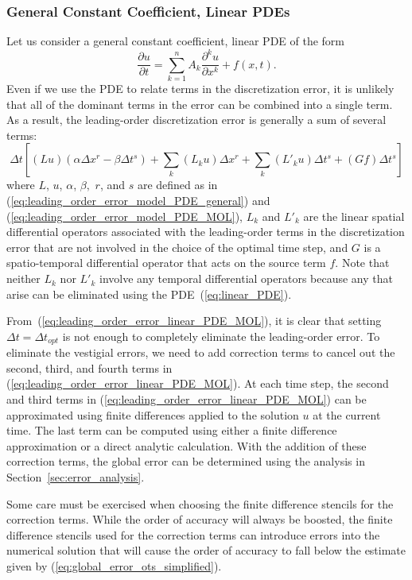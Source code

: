 \documentclass[fleqn,12pt,twoside]{article}
\newcommand{\beq}{\begin{equation}}
\newcommand{\eeq}{\end{equation}}
\def\dt{\Delta t}
\def\dx{\Delta x}
\def\dto{\dt_{opt}}
\begin{document}
\subsubsection*{\label{sec:ots_linear_pde} 
            General Constant Coefficient, Linear PDEs} 
Let us consider a general constant coefficient, linear PDE of the form
\beq
  \frac{\partial u}{\partial t} = 
  \sum_{k=1}^n A_k \frac{\partial^k u}{\partial x^k} + f(x,t)
  \label{eq:linear_PDE}.
\eeq
Even if we use the PDE to relate terms in the discretization error, it is
unlikely that all of the dominant terms in the error can be combined into 
a single term.   As a result, the leading-order discretization error is
generally a sum of several terms:
\beq
  \dt\left[ (L u) (\alpha \dx^r - \beta \dt^s) 
  + \sum_k (L_k u) \dx^r 
  + \sum_k (L'_k u) \dt^s 
  + (G f) \dt^s \right]
  \label{eq:leading_order_error_linear_PDE_MOL}
\eeq
where $L$, $u$, $\alpha$, $\beta,$ $r$, and $s$ are defined as in
(\ref{eq:leading_order_error_model_PDE_general}) and
(\ref{eq:leading_order_error_model_PDE_MOL}), 
$L_k$ and $L'_k$ are the linear spatial differential operators associated 
with the leading-order terms in the discretization error that are not involved 
in the choice of the optimal time step, and $G$ is a spatio-temporal 
differential operator that acts on the source term $f$.  
Note that neither $L_k$ nor $L'_k$ involve any temporal differential 
operators because any that arise can be eliminated using the 
PDE~(\ref{eq:linear_PDE}).  

From~(\ref{eq:leading_order_error_linear_PDE_MOL}), it is clear that setting 
$\dt = \dto$ is not enough to completely eliminate the 
leading-order error.  To eliminate the vestigial errors, we need to add 
correction terms to cancel out the second, third, and fourth terms in 
(\ref{eq:leading_order_error_linear_PDE_MOL}).  At each time step, the second 
and third terms in (\ref{eq:leading_order_error_linear_PDE_MOL}) can be 
approximated using finite differences applied to the solution $u$ at the 
current time.
The last term can be computed using either a finite difference approximation 
or a direct analytic calculation.  With the addition of these correction 
terms, the global error can be determined using the analysis in 
Section~\ref{sec:error_analysis}.

Some care must be exercised when choosing the finite difference 
stencils for the correction terms.  While the order of accuracy will always
be boosted, the finite difference stencils used for the correction terms
can introduce errors into the numerical solution that will cause the order
of accuracy to fall below the estimate given by 
(\ref{eq:global_error_ots_simplified}).
\end{document}
